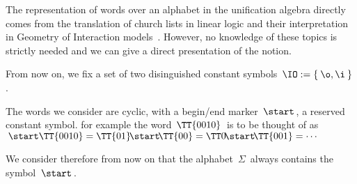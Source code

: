 The representation of words over an alphabet in the unification algebra directly comes from the translation of church lists in linear logic and their interpretation in Geometry of Interaction models~\cite{girard_geometry_1989,girard_geometry_1995}. However, no knowledge of these topics is strictly needed and we can give a direct presentation of the notion.

\medskip
From now on, we fix a set of two disinguished constant symbols $\,\IO:=\{\:\o,\i\:\}\,$.



The words we consider are cyclic, with a begin/end marker $\,\start\,$, a reserved constant symbol. for example the word $\,\TT{0010}\,$ is to be thought of as $\,\start\TT{0010}=\TT{01}\!\start\!\TT{00}=\TT0\!\start\!\TT{001}=\cdots\,$

We consider therefore from now on that the alphabet $\,\Sigma\,$ always contains the symbol $\,\start\,$.


